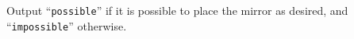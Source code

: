 
    Output ``\texttt{possible}'' if it is possible to place the mirror as desired, and ``\texttt{impossible}'' otherwise.
